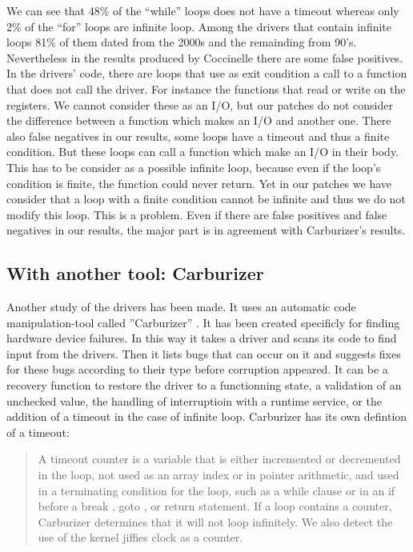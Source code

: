 \documentclass[a4paper,12pt]{article}
\begin{document}
We can see that 48\% of the ``while'' loops does not have a timeout whereas only 2\% of the ``for'' loops are infinite loop. Among the drivers that contain infinite loops 81\% of them dated from the 2000s and the remainding from 90's. %
Nevertheless in the results produced by Coccinelle there are some false positives. In the drivers' code, there are loops that use as exit condition a call to a function that does not call the driver. For instance the functions that read or write on the registers. We cannot consider these as an I/O, but our patches do not consider the difference between a function which makes an I/O and another one.
There also false negatives in our results, some loops have a timeout and thus a finite condition. But these loops can call a function which make an I/O in their body. This has to be consider as a possible infinite loop, because even if the loop's condition is finite, the function could never return. Yet in our patches we have consider that a loop with a finite condition cannot be infinite and thus we do not modify this loop. This is a problem.
Even if there are false positives and false negatives in our results, the major part is in agreement with Carburizer's results.

\subsection{With another tool: Carburizer}

Another study of the drivers has been made. It uses an automatic code manipulation-tool called ''Carburizer'' \cite{Carburizer}. It has been created specificly for finding hardware device failures. In this way it takes a driver and scans its code to find input from the drivers. Then it lists bugs that can occur on it and suggests fixes for these bugs according to their type before corruption appeared. It can be a recovery function to restore the driver to a functionning state, a validation of an unchecked value, the handling of interruptioin with a runtime service, or the addition of a timeout in the case of infinite loop. Carburizer has its own defintion of a timeout: 
\begin{quotation}
A timeout counter is a variable that is either incremented or decremented in the loop, not used as an array index or in pointer arithmetic, and used in a terminating condition for the loop, such as a while clause or in an if before a break , goto , or return statement. If a loop contains a counter, Carburizer determines that it will not loop infinitely. We also detect the use of the kernel jiffies clock as a counter.
\end{quotation}
\end{document}
